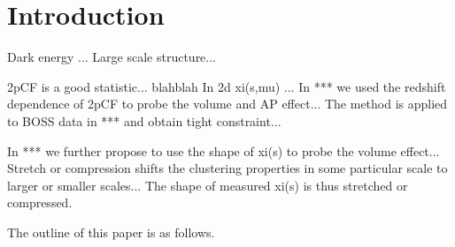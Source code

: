 \documentclass[iop]{emulateapj}
\begin{document}



\section{Introduction}


 

Dark energy ... Large scale structure...

 

2pCF is a good statistic... blahblah
In 2d xi(s,mu) ...
In *** we used the redshift dependence of 2pCF to probe the volume and AP effect...
The method is applied to BOSS data in *** and obtain tight constraint...

 

In *** we further propose to use the shape of xi(s) to probe the volume effect...
Stretch or compression shifts the clustering properties in some particular scale to larger or smaller scales...
The shape of measured xi(s) is thus stretched or compressed.




The outline of this paper is as follows. 
\end{document}
